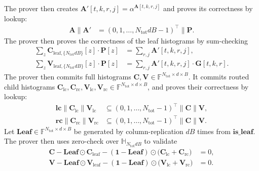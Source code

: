 The prover then creates $\mathbf{A}'[t,k,r,j] = \alpha^{\mathbf{A}[t,k,r,j]}$ and proves its correctness by lookup:
\begin{align}
    \mathbf{A}\|\mathbf{A}'
    &=
    (0, 1, \dots, N_{\mathrm{tot}}dB-1)^\top\|
    \mathbf{P}.
\end{align}
The prover then proves the correctness of the leaf histograms by sum-checking
\begin{align}
    \sum_z \mathbf{C}_{\mathrm{leaf},\{N_{\mathrm{tot}}dB\}}[z] \cdot \mathbf{P}[z]
    &=
    \sum_{r,j}\mathbf{A}'[t,k,r,j],\\
    \sum_z \mathbf{V}_{\mathrm{leaf},\{N_{\mathrm{tot}}dB\}}[z] \cdot \mathbf{P}[z]
    &=
    \sum_{r,j}\mathbf{A}'[t,k,r,j]\cdot \mathbf{G}[t,k,r].
\end{align}
The prover then commits full histograms
$\mathbf{C},\mathbf{V}
\in\mathbb{F}^{N_{\mathrm{tot}}\times d\times B}$.
It commits routed child histograms
$\mathbf{C}_{\mathrm{lc}},\mathbf{C}_{\mathrm{rc}},
\mathbf{V}_{\mathrm{lc}},\mathbf{V}_{\mathrm{rc}}
\in\mathbb{F}^{N_{\mathrm{tot}}\times d\times B}$,
and proves their correctness by lookup:
\begin{align}
    \mathbf{lc}\|\mathbf{C}_{\mathrm{lc}}\|\mathbf{V}_{\mathrm{lc}}
    &\subseteq
    (0,1,\dots,N_{\mathrm{tot}}-1)^\top\|
    \mathbf{C}\|\mathbf{V},\\
    \mathbf{rc}\|\mathbf{C}_{\mathrm{rc}}\|\mathbf{V}_{\mathrm{rc}}
    &\subseteq
    (0,1,\dots,N_{\mathrm{tot}}-1)^\top\|
    \mathbf{C}\|\mathbf{V}.
\end{align}
Let $\mathbf{Leaf}\in\mathbb{F}^{N_{\mathrm{tot}}\times d\times B}$
be generated by column-replication $dB$ times from $\mathbf{is\_leaf}$.
The prover then uses zero-check over $\mathbb{H}_{N_{\mathrm{tot}}dB}$ to validate
\begin{align}
    \mathbf{C}
    -
    \mathbf{Leaf}\odot\mathbf{C}_{\mathrm{leaf}}
    -(\mathbf{1}-\mathbf{Leaf})\odot
    \bigl(\mathbf{C}_{\mathrm{lc}}+\mathbf{C}_{\mathrm{rc}}\bigr) &= 0,\\
    \mathbf{V}
    -
    \mathbf{Leaf}\odot\mathbf{V}_{\mathrm{leaf}}
    -(\mathbf{1}-\mathbf{Leaf})\odot
    \bigl(\mathbf{V}_{\mathrm{lc}}+\mathbf{V}_{\mathrm{rc}}\bigr) &= 0.
\end{align}

